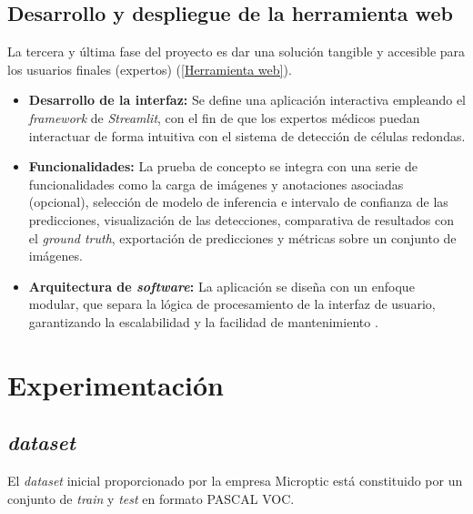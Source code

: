 \documentclass[12pt,a4paper,onecolumn,oneside]{report}
\begin{document}
\section{Desarrollo y despliegue de la herramienta web}
\label{Despliegue de la herramienta web}

La tercera y última fase del proyecto es dar una solución tangible y accesible para los usuarios finales (expertos) (\autoref{Herramienta web}).

\begin{itemize}
  \item \textbf{Desarrollo de la interfaz:} Se define una aplicación interactiva empleando el \textit{framework} de \textit{Streamlit}, con el fin de que los expertos médicos puedan interactuar de forma intuitiva con el sistema de detección de células redondas.
  \item \textbf{Funcionalidades:} La prueba de concepto se integra con una serie de funcionalidades como la carga de imágenes y anotaciones asociadas (opcional), selección de modelo de inferencia e intervalo de confianza de las predicciones, 
  visualización de las detecciones, comparativa de resultados con el \textit{ground truth}, exportación de predicciones y métricas sobre un conjunto de imágenes. 
  \item \textbf{Arquitectura de \textit{software}:} La aplicación se diseña con un enfoque modular, que separa la lógica de procesamiento de la interfaz de usuario, garantizando la escalabilidad y la facilidad de mantenimiento \cite{repoTFM}.
\end{itemize}

\chapter{Experimentación} %
\label{Experimentación}

\section{\textit{dataset}}
\label{sec:Dataset}
El \textit{dataset} inicial proporcionado por la empresa Microptic \cite{microptic} está constituido por un conjunto de \textit{train} y \textit{test} en formato PASCAL VOC.
\end{document}
